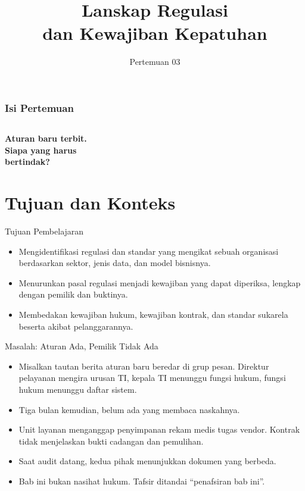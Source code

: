 \documentclass[aspectratio=169, table, 12pt]{beamer}
\title{\Huge Lanskap Regulasi\\ \vspace{10pt} dan Kewajiban Kepatuhan}
\date{Pertemuan 03}
\begin{document}
\frame{\titlepage}

\begin{frame}
  \frametitle{Isi Pertemuan}
  \vspace{14pt}
  \begin{columns}[t]
    {\small\tableofcontents[sections={1-4}]}

    {\small\tableofcontents[sections={5-8}]}
  \end{columns}
\end{frame}

\begin{frame}{\hfill}
  \centering
  \Huge{\textbf{Aturan baru terbit.\\Siapa yang harus\\bertindak?}}
\end{frame}

\section{Tujuan dan Konteks}

\begin{frame}{{\Large Tujuan Pembelajaran}}
  \vspace{10pt}
  \begin{itemize}
    \item Mengidentifikasi regulasi dan standar yang mengikat sebuah organisasi berdasarkan
          sektor, jenis data, dan model bisnisnya.
    \item Menurunkan pasal regulasi menjadi kewajiban yang dapat diperiksa, lengkap dengan
          pemilik dan buktinya.
    \item Membedakan kewajiban hukum, kewajiban kontrak, dan standar sukarela beserta akibat
          pelanggarannya.
  \end{itemize}
\end{frame}

\begin{frame}{{\Large Masalah: Aturan Ada, Pemilik Tidak Ada}}
  \vspace{6pt}
  \small
  \begin{itemize}
    \item Misalkan tautan berita aturan baru beredar di grup pesan. Direktur pelayanan mengira
          urusan TI, kepala TI menunggu fungsi hukum, fungsi hukum menunggu daftar sistem.
    \item Tiga bulan kemudian, belum ada yang membaca naskahnya.
    \item Unit layanan menganggap penyimpanan rekam medis tugas vendor. Kontrak tidak menjelaskan
          bukti cadangan dan pemulihan.
    \item Saat audit datang, kedua pihak menunjukkan dokumen yang berbeda.
    \item Bab ini bukan nasihat hukum. Tafsir ditandai ``penafsiran bab ini''.
  \end{itemize}
\end{frame}
\end{document}
